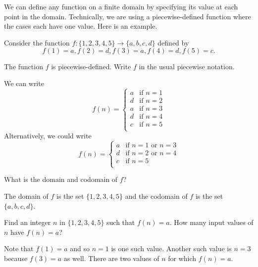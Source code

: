 We can define any function on a finite domain by specifying its value at each point in the domain.  Technically, we are using a piecewise-defined function where the cases each have one value.  Here is an example.

\begin{exam}
\label{exam_function_finite}
    Consider the function $f: \{1, 2, 3, 4, 5\} \to \{a,b,c,d\}$ defined by
    $$f(1) = a, f(2) = d, f(3) = a, f(4) = d, f(5)= c.$$  
    \begin{apart}
        \item The function $f$ is piecewise-defined.  Write $f$ in the usual piecewise notation.
            \begin{soln}
                We can write
                    $$f(n) = \left\{ \begin{array} {cl}
                        a & \text{if } n =1 \\
                        d & \text{if } n =2 \\
                        a & \text{if } n =3 \\
                        d & \text{if } n =4 \\            
                        c & \text{if } n =5 \\
                    \end{array} \right.$$ 
                Alternatively, we could write
                    $$f(n) = \left\{ \begin{array} {cl}
                        a & \text{if } n =1 \text{ or } n=3\\
                        d & \text{if } n =2 \text{ or } n=4\\     
                        c & \text{if } n =5 \\
                    \end{array} \right.$$ 
            \end{soln}
        \item What is the domain and codomain of $f$? 
            \begin{soln}
                The domain of $f$ is the set $\{1, 2, 3, 4, 5\}$ and the codomain of $f$ is the set $\{a,b,c,d\}$.  
            \end{soln}
        \item Find an integer $n$ in $\{1,2,3,4,5\}$ such that $f(n) = a$.  How many input values of $n$ have $f(n) = a$?
            \begin{soln}
                Note that $f(1) = a$ and so $n=1$ is one such value.  Another such value is $n=3$ because $f(3)=a$ as well.  There are two values of $n$ for which $f(n) = a$.

\end{soln}
\end{apart}
\end{exam}
